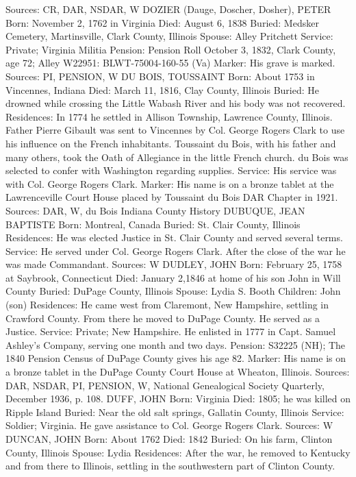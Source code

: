 Sources: CR, DAR, NSDAR, W 
DOZIER (Dauge, Doscher, Dosher), PETER
Born: November 2, 1762 in Virginia 
Died: August 6, 1838 
Buried: Medsker Cemetery, Martinsville, Clark County, Illinois 
Spouse: Alley Pritchett 
Service: Private; Virginia Militia 
Pension: Pension Roll October 3, 1832, Clark County, age 72; Alley W22951: BLWT-75004-160-55 (Va) 
Marker: His grave is marked. 
Sources: PI, PENSION, W 
DU BOIS, TOUSSAINT 
Born: About 1753 in Vincennes, Indiana 
Died: March 11, 1816, Clay County, Illinois 
Buried: He drowned while crossing the Little Wabash River and his body was not recovered. 
Residences: In 1774 he settled in Allison Township, Lawrence County, Illinois. Father Pierre Gibault was sent to Vincennes by Col. George Rogers Clark to use his influence on the French inhabitants. Toussaint du Bois, with his father and many others, took the Oath of Allegiance in the little French church. du Bois was selected to confer with Washington regarding supplies. 
Service: His service was with Col. George Rogers Clark. Marker: His name is on a bronze tablet at the Lawrenceville Court House placed by Toussaint du Bois DAR Chapter in 1921. 
Sources: DAR, W, du Bois Indiana County History 
DUBUQUE, JEAN BAPTISTE 
Born: Montreal, Canada 
Buried: St. Clair County, Illinois 
Residences: He was elected Justice in St. Clair County and served several terms. 
Service: He served under Col. George Rogers Clark. After the close of the war he was made Commandant. 
Sources: W 
DUDLEY, JOHN 
Born: February 25, 1758 at Saybrook, Connecticut 
Died: January 2,1846 at home of his son John in Will County 
Buried: DuPage County, Illinois 
Spouse: Lydia S. Booth 
Children: John (son) 
Residences: He came west from Claremont, New Hampshire, settling in Craw­ford County. From there he moved to DuPage County. He served as a Justice. Service: Private; New Hampshire. He enlisted in 1777 in Capt. Samuel Ashley's Company, serving one month and two days. 
Pension: S32225 (NH); The 1840 Pension Census of DuPage County gives his age 82. 
Marker: His name is on a bronze tablet in the DuPage County Court House at Wheaton, Illinois. 
Sources: DAR, NSDAR, PI, PENSION, W, National Genealogical Society Quar­terly, December 1936, p. 108. 
DUFF, JOHN 
Born: Virginia 
Died: 1805; he was killed on Ripple Island 
Buried: Near the old salt springs, Gallatin County, Illinois 
Service: Soldier; Virginia. He gave assistance to Col. George Rogers Clark. 
Sources: W 
DUNCAN, JOHN
Born: About 1762 
Died: 1842 
Buried: On his farm, Clinton County, Illinois 
Spouse: Lydia Residences: After the war, he removed to Kentucky and from there to Illinois, settling in the southwestern part of Clinton County. 
